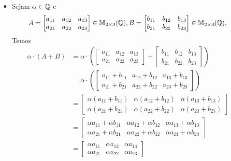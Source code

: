 \begin{exemplo}
\begin{enumerate}[label={\arabic*})]
\begin{solucao}
\begin{itemize}
              \item Sejam $\alpha \in \mathbb{Q}$ e
                    \[
                      A = \begin{bmatrix} a_{11} & a_{12} & a_{13}\\a_{21} & a_{22} & a_{23}\end{bmatrix} \in \mathbb{M}_{2 \times 3}(\mathbb{Q}),
                      B = \begin{bmatrix} b_{11} & b_{12} & b_{13}\\b_{21} & b_{22} & b_{23}\end{bmatrix} \in \mathbb{M}_{2 \times 3}(\mathbb{Q}).
                    \]
                    Temos
                    \begin{align*}
                      \alpha\cdot(A + B) & = \alpha\cdot\left(
                      \begin{bmatrix} a_{11} & a_{12} & a_{13}\\a_{21} & a_{22} & a_{23}\end{bmatrix} +
                      \begin{bmatrix} b_{11} & b_{12} & b_{13}\\b_{21} & b_{22} & b_{23}\end{bmatrix}\right)
                      \\ &= \alpha\cdot\left(\begin{bmatrix} a_{11} + b_{11} & a_{12} + b_{12} & a_{13} + b_{13}\\a_{21} + b_{21} & a_{22} + b_{22} & a_{23} + b_{23}\end{bmatrix}\right)
                      \\ &= \begin{bmatrix} \alpha(a_{11} + b_{11}) & \alpha(a_{12} + b_{12}) & \alpha(a_{13} + b_{13})\\\alpha(a_{21} + b_{21}) & \alpha(a_{22} + b_{22}) & \alpha(a_{23} + b_{23})\end{bmatrix}
                      \\ &= \begin{bmatrix} \alpha a_{11} + \alpha b_{11} & \alpha a_{12} + \alpha b_{12} & \alpha a_{13} + \alpha b_{13}\\\alpha a_{21} + \alpha b_{21} & \alpha a_{22} + \alpha b_{22} & \alpha a_{23} + \alpha b_{23}\end{bmatrix}
                      \\ &= \begin{bmatrix} \alpha a_{11} & \alpha a_{12} & \alpha a_{13} \\ \alpha a_{21} & \alpha a_{22} & \alpha a_{23} \end{bmatrix}

\end{align*}
\end{itemize}
\end{solucao}
\end{enumerate}
\end{exemplo}
